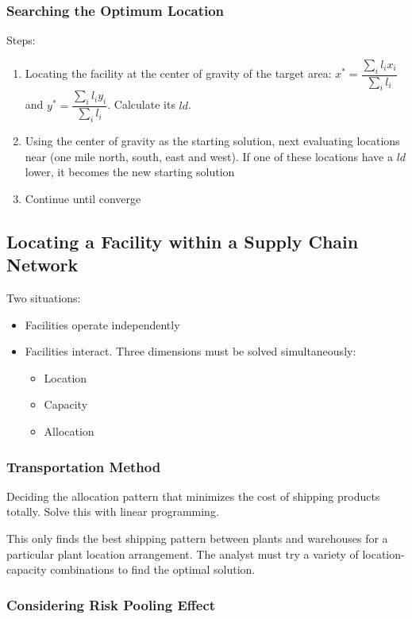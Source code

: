 \documentclass{article}
\begin{document}
\subsubsection{Searching the Optimum Location}

Steps:
\begin{enumerate}
	\item Locating the facility at the center of gravity of the target area:
	      $x^* = \dfrac{\sum_i l_i x_i}{\sum_i l_i}$ and $y^* = \dfrac{\sum_i l_i y_i}{\sum_i l_i}$.
	      Calculate its $ld$.
	\item Using the center of gravity as the starting solution, next evaluating locations near
	      (one mile north, south, east and west). If one of these locations have a $ld$ lower, it
	      becomes the new starting solution
	\item Continue until converge
\end{enumerate}

\subsection{Locating a Facility within a Supply Chain Network}

Two situations:
\begin{itemize}
	\item Facilities operate independently
	\item Facilities interact. Three dimensions must be solved simultaneously:
	      \begin{itemize}
		      \item Location
		      \item Capacity
		      \item Allocation
	      \end{itemize}
\end{itemize}

\subsubsection{Transportation Method}

Deciding the allocation pattern that minimizes the cost of shipping products totally.
Solve this with linear programming.

This only finds the best shipping pattern between plants and warehouses for a particular plant location arrangement.
The analyst must try a variety of location-capacity combinations to find the optimal solution.

\subsubsection{Considering Risk Pooling Effect}
\end{document}
